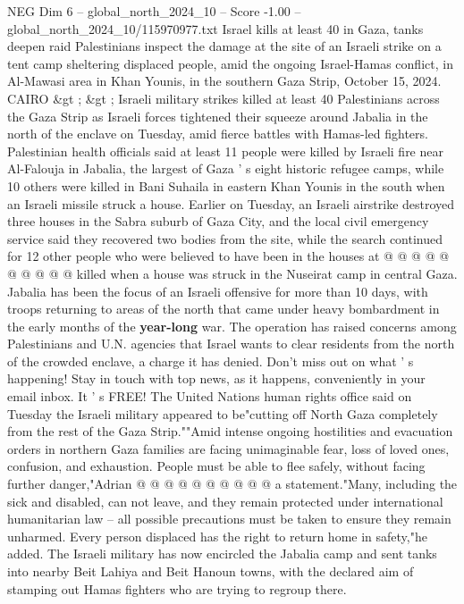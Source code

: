 \begin{textsample}{NEG Dim 6 – global\_north\_2024\_10 – Score -1.00 – global\_north\_2024\_10/115970977.txt}  \label{ex:f6_neg_084}
Israel kills at least 40 in Gaza, tanks deepen raid Palestinians inspect the damage at the site of an Israeli strike on a tent camp sheltering displaced people, amid the ongoing Israel-Hamas conflict, in Al-Mawasi area in Khan Younis, in the southern Gaza Strip, October 15, 2024.
CAIRO \&gt ; \&gt ; Israeli military strikes killed at least 40 Palestinians across the Gaza Strip as Israeli forces tightened their squeeze around Jabalia in the north of the enclave on Tuesday, amid fierce battles with Hamas-led fighters.
Palestinian health officials said at least 11 people were killed by Israeli fire near Al-Falouja in Jabalia, the largest of Gaza ' s eight historic refugee camps, while 10 others were killed in Bani Suhaila in eastern Khan Younis in the south when an Israeli missile struck a house.
Earlier on Tuesday, an Israeli airstrike destroyed three houses in the Sabra suburb of Gaza City, and the local civil emergency service said they recovered two bodies from the site, while the search continued for 12 other people who were believed to have been in the houses at @ @ @ @ @ @ @ @ @ @ killed when a house was struck in the Nuseirat camp in central Gaza.
Jabalia has been the focus of an Israeli offensive for more than 10 days, with troops returning to areas of the north that came under heavy bombardment in the early months of the \textbf{year-long} war.
The operation has raised concerns among Palestinians and U.N. agencies that Israel wants to clear residents from the north of the crowded enclave, a charge it has denied.
Don't miss out on what ' s happening!
Stay in touch with top news, as it happens, conveniently in your email inbox.
It ' s FREE!
The United Nations human rights office said on Tuesday the Israeli military appeared to be"cutting off North Gaza completely from the rest of the Gaza Strip.""Amid intense ongoing hostilities and evacuation orders in northern Gaza families are facing unimaginable fear, loss of loved ones, confusion, and exhaustion.
People must be able to flee safely, without facing further danger,"Adrian @ @ @ @ @ @ @ @ @ @ a statement."Many, including the sick and disabled, can not leave, and they remain protected under international humanitarian law -- all possible precautions must be taken to ensure they remain unharmed.
Every person displaced has the right to return home in safety,"he added.
The Israeli military has now encircled the Jabalia camp and sent tanks into nearby Beit Lahiya and Beit Hanoun towns, with the declared aim of stamping out Hamas fighters who are trying to regroup there.

\end{textsample}
